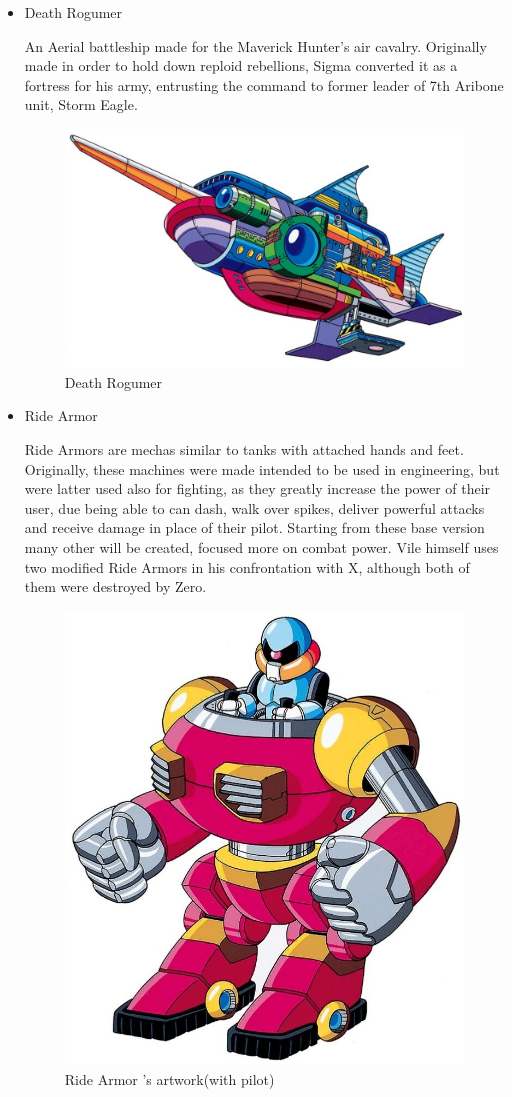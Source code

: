 \begin{itemize}
	\item \hypertarget{veichle:Death_Rogumer}{Death Rogumer}
	An Aerial battleship made for the Maverick Hunter's air cavalry. Originally made in order to hold down reploid rebellions, Sigma converted it as a fortress 
	for his army, entrusting the command to former leader of 7th Aribone unit, Storm Eagle\cite{wayback:X_resources}.
	\begin{figure}[htp]
		\centering
		\includegraphics[width=\linewidth]{figures/X1/Storm_eagle/DeathRogumer.jpg}
		\caption{Death Rogumer}
	\end{figure}
	\item \hypertarget{veichle:Ride_Armor}{Ride Armor}
	Ride Armors are mechas similar to tanks with attached hands and feet. Originally, these machines were made intended to be used in engineering\cite{wayback:X_resources}, but were latter used also for fighting, as they greatly increase the power of their user, due being able to can dash, walk over spikes, deliver powerful attacks and receive damage in place of 
	their pilot. Starting from these base version many other will be created, focused more on combat power. Vile himself uses two modified Ride Armors in his confrontation with X, although both of them were destroyed by Zero.
	\begin{figure}[htp]
		\centering
		\includegraphics[width=0.5\linewidth]{figures/X1/enemies/ArmorSoldier.jpg}
		\caption{Ride Armor 's artwork(with pilot)}
	\end{figure}
	
\end{itemize}